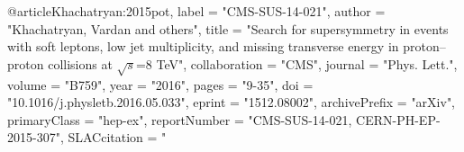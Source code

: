 

@article{Khachatryan:2015pot,
      label          = "CMS-SUS-14-021",
      author         = "Khachatryan, Vardan and others",
      title          = "{Search for supersymmetry in events with soft leptons,
                        low jet multiplicity, and missing transverse energy in
                        proton--proton collisions at $\sqrt{s}$=8 TeV}",
      collaboration  = "CMS",
      journal        = "Phys. Lett.",
      volume         = "B759",
      year           = "2016",
      pages          = "9-35",
      doi            = "10.1016/j.physletb.2016.05.033",
      eprint         = "1512.08002",
      archivePrefix  = "arXiv",
      primaryClass   = "hep-ex",
      reportNumber   = "CMS-SUS-14-021, CERN-PH-EP-2015-307",
      SLACcitation   = "%
}

